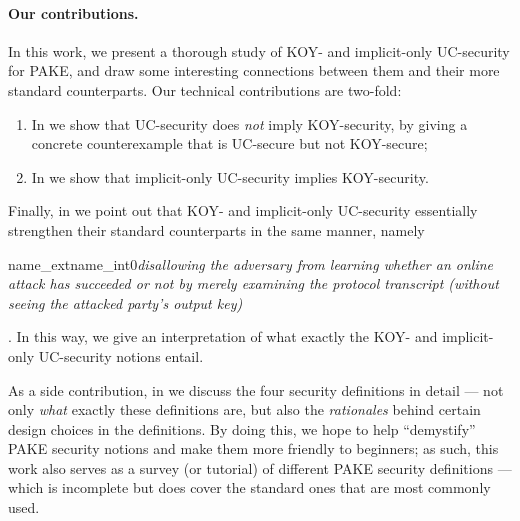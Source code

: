 \documentclass{article}
\begin{document}
\paragraph{Our contributions.}
In this work, we present a thorough study of KOY- and implicit-only UC-security for PAKE, and draw some interesting connections between them and their more standard counterparts. Our technical contributions are two-fold:
\begin{enumerate}
  \item In  we show that UC-security does \emph{not} imply KOY-security, by giving a concrete counterexample that is UC-secure but not KOY-secure;
  \item In  we show that implicit-only UC-security implies KOY-security.
\end{enumerate}
\usetikzlibrary{decorations.markings}
\begin{figure}[H]
\begin{center}
\end{center}
\end{figure}
Finally, in  we point out that KOY- and implicit-only UC-security essentially strengthen their standard counterparts in the same manner, namely 
\begin{ocg}{name_ext}{name_int}{0}\emph{disallowing the adversary from learning whether an online attack has succeeded or not by merely examining the protocol transcript (without seeing the attacked party's output key)}\end{ocg}. In this way, we give an interpretation of what exactly the KOY- and implicit-only UC-security notions entail.

As a side contribution, in  we discuss the four security definitions in detail --- not only \emph{what} exactly these definitions are, but also the \emph{rationales} behind certain design choices in the definitions. By doing this, we hope to help ``demystify'' PAKE security notions and make them more friendly to beginners; as such, this work also serves as a survey (or tutorial) of different PAKE security definitions --- which is incomplete but does cover the standard ones that are most commonly used.
\end{document}
